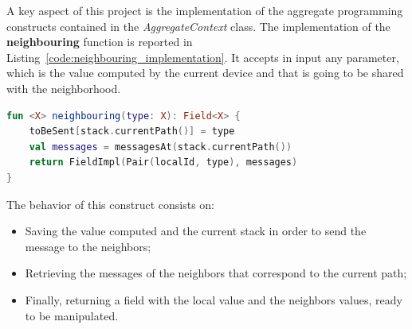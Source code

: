 A key aspect of this project is the implementation of the aggregate programming constructs contained in the \textit{AggregateContext} class.\newline
The implementation of the \textbf{neighbouring} function is reported in Listing~\ref{code:neighbouring_implementation}. It accepts in input any parameter, which is the value computed by the current device and that is going to be shared with the neighborhood.
\begin{lstlisting}[caption={Neighbouring implementation}, captionpos=b, language=Kotlin, label={code:neighbouring_implementation}]
fun <X> neighbouring(type: X): Field<X> {
    toBeSent[stack.currentPath()] = type
    val messages = messagesAt(stack.currentPath())
    return FieldImpl(Pair(localId, type), messages)
}
\end{lstlisting}
The behavior of this construct consists on:
\begin{itemize}
    \item Saving the value computed and the current stack in order to send the message to the neighbors;
    \item Retrieving the messages of the neighbors that correspond to the current path;
    \item Finally, returning a field with the local value and the neighbors values, ready to be manipulated.
\end{itemize}

